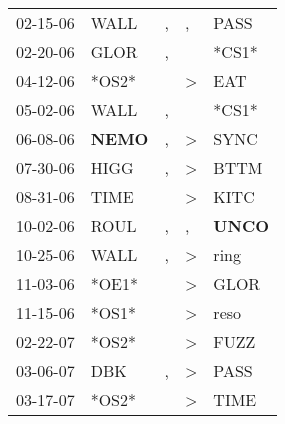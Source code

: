 \begin{supertabular}{p{0.07\textwidth}p{0.06\textwidth}p{0.02\textwidth}p{0.02\textwidth}p{0.06\textwidth}}
          02-15-06\textsuperscript{} &           WALL\textsuperscript{} &                , &                , &           PASS\textsuperscript{} \\
          02-20-06\textsuperscript{} &           GLOR\textsuperscript{} &                , &                  &                            *CS1* \\
          04-12-06\textsuperscript{} &                            *OS2* &                  &     \textgreater &            EAT\textsuperscript{} \\
          05-02-06\textsuperscript{} &           WALL\textsuperscript{} &                , &                  &                            *CS1* \\
          06-08-06\textsuperscript{} &  \textbf{NEMO\textsuperscript{}} &                , &     \textgreater &           SYNC\textsuperscript{} \\
          07-30-06\textsuperscript{} &           HIGG\textsuperscript{} &                , &     \textgreater &           BTTM\textsuperscript{} \\
          08-31-06\textsuperscript{} &           TIME\textsuperscript{} &                  &     \textgreater &           KITC\textsuperscript{} \\
          10-02-06\textsuperscript{} &           ROUL\textsuperscript{} &                , &                , &  \textbf{UNCO\textsuperscript{}} \\
          10-25-06\textsuperscript{} &           WALL\textsuperscript{} &                , &     \textgreater &           ring\textsuperscript{} \\
          11-03-06\textsuperscript{} &                            *OE1* &                  &     \textgreater &           GLOR\textsuperscript{} \\
          11-15-06\textsuperscript{} &                            *OS1* &                  &     \textgreater &           reso\textsuperscript{} \\
          02-22-07\textsuperscript{} &                            *OS2* &                  &     \textgreater &           FUZZ\textsuperscript{} \\
          03-06-07\textsuperscript{} &            DBK\textsuperscript{} &                , &     \textgreater &           PASS\textsuperscript{} \\
          03-17-07\textsuperscript{} &                            *OS2* &                  &     \textgreater &           TIME\textsuperscript{} \\

\end{supertabular}
